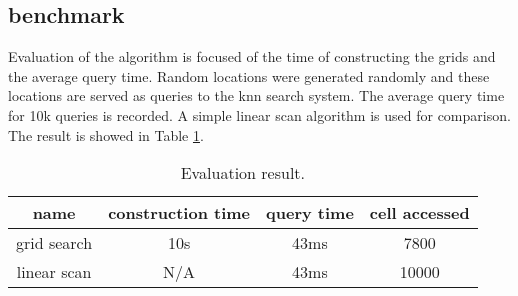 \documentclass{article}
\begin{document}
\subsection{benchmark}
Evaluation of the algorithm is focused of the time of constructing the grids
and the average query time. Random locations were generated randomly and
these locations are served as queries to the knn search system. The average
query time for 10k queries is recorded. A simple linear scan algorithm is
used for comparison. The result is showed in Table \ref{result}.

\begin{table}[tbh]
  \center
  \footnotesize
  \begin{tabular}{c|c|c|c}
    \textbf{name} & \textbf{construction time} & \textbf{query time} & \textbf{cell accessed}\\
    \hline
    grid search & 10s & 43ms & 7800 \\
    \hline
    linear scan & N/A & 43ms & 10000
  \end{tabular}
  \caption{Evaluation result.}
  \label{result}

\end{table}
\end{document}
